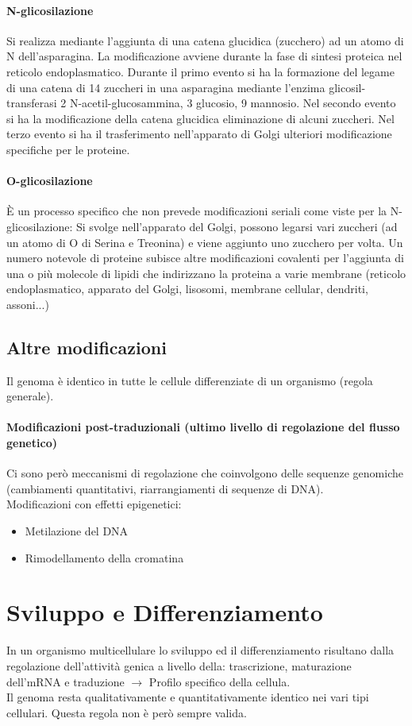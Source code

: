 \documentclass{article}
\begin{document}
\paragraph{N-glicosilazione}Si realizza mediante l'aggiunta di una catena glucidica (zucchero) ad un atomo di N dell'asparagina.
La modificazione avviene durante la fase di sintesi proteica nel reticolo endoplasmatico.
Durante il primo evento si ha la formazione del legame di una catena di 14 zuccheri in una asparagina mediante l'enzima glicosil-transferasi
2 N-acetil-glucosammina, 3 glucosio, 9 mannosio. Nel secondo evento si ha la modificazione della catena glucidica
eliminazione di alcuni zuccheri. Nel terzo evento si ha il trasferimento nell'apparato di Golgi
ulteriori modificazione specifiche per le proteine.
\paragraph{O-glicosilazione}
È un processo specifico che non prevede modificazioni seriali come viste per la N- glicosilazione: Si svolge nell'apparato del Golgi, possono legarsi vari zuccheri (ad un atomo di O di Serina e Treonina) e viene aggiunto uno zucchero per volta.
Un numero notevole di proteine subisce altre modificazioni covalenti per l'aggiunta
di una o più molecole di lipidi che indirizzano la proteina a varie membrane (reticolo
endoplasmatico, apparato del Golgi, lisosomi, membrane cellular, dendriti,
assoni...)
\subsection{Altre modificazioni}
Il genoma è identico in tutte le cellule differenziate di un organismo (regola generale). 
\paragraph{Modificazioni post-traduzionali (ultimo livello di regolazione del flusso genetico)}
Ci sono però meccanismi di regolazione che coinvolgono delle sequenze genomiche (cambiamenti quantitativi, riarrangiamenti di sequenze di DNA).\\
Modificazioni con effetti epigenetici:
\begin{itemize}
    \item Metilazione del DNA
    \item Rimodellamento della cromatina
\end{itemize}
\section{Sviluppo e Differenziamento}
In un organismo multicellulare lo sviluppo ed il differenziamento risultano dalla regolazione
dell'attività genica a livello della: trascrizione, maturazione dell'mRNA e traduzione $\rightarrow$ Profilo specifico della cellula.\\
Il genoma resta qualitativamente e quantitativamente identico nei vari tipi cellulari. Questa regola non è però sempre valida.
\end{document}

